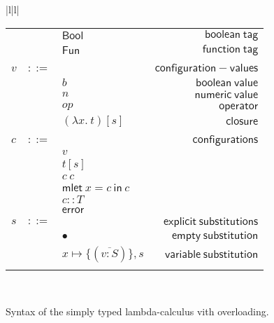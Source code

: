 \documentclass[preprint,authoryear,sort&compress,9pt,nocopyrightspace]{article}
\newcommand{\conf}[2][s]{(#2)[#1]}
\newcommand{\subxD}{x \mapsto \{(\overline{v:S})\},s}
\newcommand{\ascrip}[1]{#1::T}
\newcommand{\oletP}[3]{\mathsf{mlet} \ x = #2 \ \mathsf{in}  \ #3}
\newcommand{\absST}[2]{\lambda #1. \ #2}
\newcommand{\negacion}[1]{\mathsf{not} \ #1}
\newcommand{\suma}[1]{\mathsf{add1} \ #1}
\newcommand{\boolt}{\mathsf{Bool}}
\newcommand{\funt}{\mathsf{Fun}}
\begin{document}
\begin{figure}
\begin{small}
\begin{center}
\begin{tabular}{|l|l|}
\begin{tabular}{l c l r}
&&$\boolt$&$\mathsf {boolean \ tag}$\\
&&$\funt$&$\mathsf {function \ tag}$\\
&&&\\
$v$&$::=$&&$\mathsf {configuration-values}$\\
&&$b$&$\mathsf {boolean \ value}$\\
&&$n$&$\mathsf{numeric \ value} $\\
&&$op$&$\mathsf{operator}$\\
&&$\conf{\absST {x}{t}}$&$\mathsf{closure}$\\
&&&\\
$c$&$::=$&&$\mathsf {configurations}$\\
&&$v$&\\
&&$t[s]$&\\
&&$c \ c $&\\
&&$\oletP {T}{c}{c}$&\\
&&$\ascrip{c}$&\\
&&$\mathsf{error}$&\\
$s$&$::=$&&$\mathsf {explicit \ substitutions}$\\
&&$ \bullet$&$\mathsf {empty \ substitution}$\\
&&$\subxD$&$\mathsf {variable \ substitution}$\\
&&&\\
\end{tabular}\\
\hline
\end{tabular}
\hspace*{-2cm}
\caption{Syntax of the simply typed lambda-calculus vith overloading.}
\label{figure:sencilla}
\end{center}
\end{small}
\end{figure}
\end{document}

